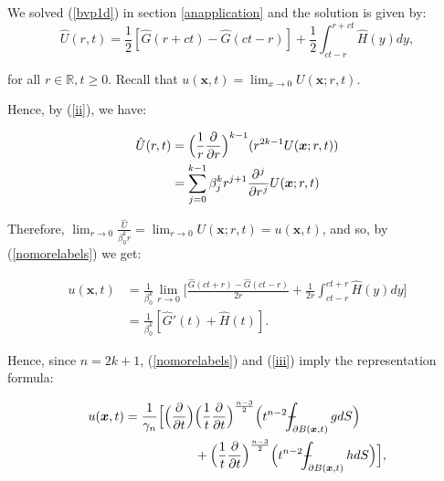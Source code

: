\documentclass[a4paper, 12pt]{article}
\def\Xint#1{\mathchoice
{\XXint\displaystyle\textstyle{#1}}%
{\XXint\textstyle\scriptstyle{#1}}%
{\XXint\scriptstyle\scriptscriptstyle{#1}}%
{\XXint\scriptscriptstyle\scriptscriptstyle{#1}}%
\!\int}
\def\XXint#1#2#3{{\setbox0=\hbox{$#1{#2#3}{\int}$ }
\vcenter{\hbox{$#2#3$ }}\kern-.6\wd0}}
\def\dashint{\Xint-}
\numberwithin{equation}{section}
\begin{document}
We solved (\ref{bvp1d}) in section \ref{anapplication} and the solution is given
by: 
\begin{equation}\label{nomorelabels}
    \hat{U}(r,t)=\frac{1}{2}[\hat{G}(r+ct)-\hat{G}(ct-r)]+\frac{1}{2}\int_{ct-r}^{r+ct}\hat{H}(y)dy,
\end{equation}

for all $r\in\mathbb{R}, t \ge 0$. Recall that $u(\boldsymbol{x},t)=\lim_{x
\rightarrow 0} U(\boldsymbol{x}; r, t)$.

Hence, by (\ref{ii}), we have:

\begin{equation*}
    \begin{aligned}
        \hat{U}(r,t)&=\Big(\frac{1}{r} \diffp[1]{}{r}\Big)^{k-1}(r^{2k-1}U(\boldsymbol{x};r,t))\\
        &=\sum_{j=0}^{k-1}\beta_j^k r^{j+1} \diffp[j]{}{r}U(\boldsymbol{x};r,t)
    \end{aligned}
\end{equation*}

Therefore, $\lim_{r \rightarrow 0} \frac{\hat{U}}{\beta_0^k r}=\lim_{r
\rightarrow 0} U(\boldsymbol{x}; r, t)=u(\boldsymbol{x}, t)$, and so, by
(\ref{nomorelabels}) we get:

\begin{equation*}
    \begin{aligned}
        u(\boldsymbol{x}, t)&=\frac{1}{\beta_0^k} \lim_{r \rightarrow 0}\Big[\frac{\hat{G}(ct+r)-\hat{G}(ct-r)}{2r} + \frac{1}{2r}\int_{ct-r}^{ct+r} \hat{H}(y)dy\Big]\\
        &= \frac{1}{\beta_0^k}[\hat{G}'(t)+\hat{H}(t)].
    \end{aligned}
\end{equation*}

Hence, since $n=2k+1$, (\ref{nomorelabels}) and (\ref{iii}) imply the
representation formula:

\begin{equation} \label{solnodd}
    \begin{split}
        u(\boldsymbol{x}, t)=\frac{1}{\gamma_n}\Big[\Big(\diffp[1]{}{t}\Big) & \Big(\frac{1}{t} \diffp[1]{}{t} \Big)^{\frac{n-3}{2}}\Big(t^{n-2} \dashint_{\partial B(\boldsymbol{x},t)}gdS \Big)\\
        &+ \Big(\frac{1}{t} \diffp[1]{}{t} \Big)^{\frac{n-3}{2}}\Big(t^{n-2} \dashint_{\partial B(\boldsymbol{x},t)}hdS \Big)\Big],
    \end{split}
\end{equation} 
\end{document}
